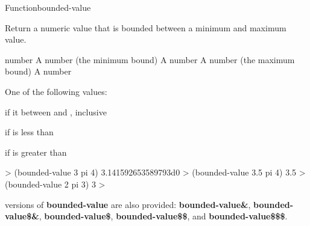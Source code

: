\documentclass[10pt,twoside,english,pdftex]{article}
\begin{document}
\begin{functiondoc}{Function}{bounded-value}{
  \returns{} }
%

\fnsyntax

\fnpurpose Return a numeric value that is bounded between a minimum
and maximum value.

\fnpackage {}

\fnmodule {}

\fnargs
\begin{args}{number}
\arg[min] A number (the minimum bound)
\arg[number] A number
\arg[max] A number (the maximum bound)
 A number
\end{args}

\fnreturns One of the following values:
\begin{tightitemize}
\item {} if it between  and , inclusive
\item {} if  is less than 
\item {} if  is greater than 
\end{tightitemize}

\fnexamples
\begin{example}
%
\W\supp
  > (bounded-value 3 pi 4)
  3.141592653589793d0
  > (bounded-value 3.5 pi 4)
  3.5
  > (bounded-value 2 pi 3)
  3
  >
\end{example}

\fnnote
%
%
%
%
%
%
%
 versions of
\textbf{bounded-value} are also provided: \textbf{bounded-value\&},
\textbf{bounded-value\$\&}, \textbf{bounded-value\$},
\textbf{bounded-value\$\$}, and \textbf{bounded-value\$\$\$}.

\end{functiondoc}

\end{document}
